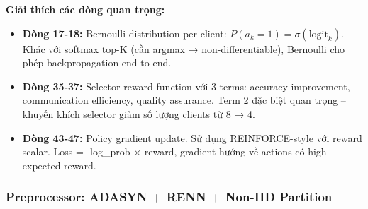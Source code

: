 \documentclass[12pt,a4paper]{article}
\begin{document}
\textbf{Giải thích các dòng quan trọng:}
\begin{itemize}
    \item \textbf{Dòng 17-18:} Bernoulli distribution per client: $P(a_k = 1) = \sigma(\text{logit}_k)$. Khác với softmax top-K (cần argmax → non-differentiable), Bernoulli cho phép backpropagation end-to-end.
    \item \textbf{Dòng 35-37:} Selector reward function với 3 terms: accuracy improvement, communication efficiency, quality assurance. Term 2 đặc biệt quan trọng -- khuyến khích selector giảm số lượng clients từ 8 → 4.
    \item \textbf{Dòng 43-47:} Policy gradient update. Sử dụng REINFORCE-style với reward scalar. Loss = -log\_prob × reward, gradient hướng về actions có high expected reward.
\end{itemize}

\subsubsection{Preprocessor: ADASYN + RENN + Non-IID Partition}
\end{document}
